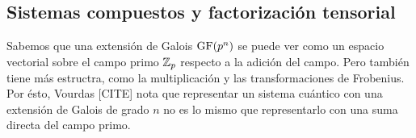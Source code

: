 %
%

\subsection{Sistemas compuestos y factorización tensorial}

Sabemos que una extensión de Galois $\operatorname{GF}(p^{n})$ se puede
ver como un espacio vectorial sobre el campo primo $\operatorname{\mathbb{Z}}_p$
respecto a la adición del campo. Pero también tiene más
estructra, como la multiplicación y las transformaciones
de Frobenius. Por ésto, Vourdas [CITE] nota que
representar un sistema cuántico con una extensión de
Galois de grado $n$ no es lo mismo que representarlo con
una suma directa del campo primo. 

